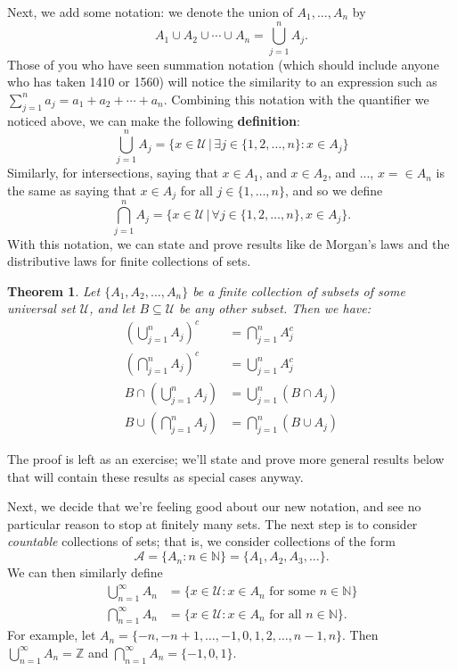 \documentclass[letterpaper,12pt]{article}
\newtheorem{theorem}{Theorem}
\newcommand{\U}{\mathcal{U}}
\newcommand{\N}{\mathbb{N}}
\begin{document}
Next, we add some notation: we denote the union of $A_1,\ldots, A_n$ by 
\[
A_1\cup A_2\cup \cdots \cup A_n =  \bigcup_{j=1}^n A_j.
\]
Those of you who have seen summation notation (which should include anyone who has taken 1410 or 1560) will notice the similarity to an expression such as $\displaystyle \sum_{j=1}^na_j = a_1+a_2+\cdots +a_n$. Combining this notation with the quantifier we noticed above, we can make the following {\bf definition}:
\[
 \bigcup_{j=1}^n A_j = \{x\in\U \,|\, \exists j\in\{1,2,\ldots, n\}: x\in A_j\}
\]
Similarly, for intersections, saying that $x\in A_1$, and $x\in A_2$, and ..., $x=\in A_n$ is the same as saying that $x\in A_j$ for all $j\in\{1,\ldots, n\}$, and so we define
\[
 \bigcap_{j=1}^nA_j = \{x\in\U\,|\, \forall j\in\{1,2,\ldots, n\}, x\in A_j\}.
\]
With this notation, we can state and prove results like de Morgan's laws and the distributive laws for finite collections of sets.
\begin{theorem}
 Let $\{A_1,A_2,\ldots, A_n\}$ be a finite collection of subsets of some universal set $\U$, and let $B\subseteq \U$ be any other subset. Then we have:
\begin{align}
 \left(\bigcup_{j=1}^n A_j\right)^c &= \bigcap_{j=1}^n A_j^c\\
 \left(\bigcap_{j=1}^n A_j\right)^c &= \bigcup_{j=1}^n A_j^c\\
 B\cap\left(\bigcup_{j=1}^n A_j\right) &= \bigcup_{j=1}^n(B\cap A_j)\\
 B\cup\left(\bigcap_{j=1}^n A_j\right) &= \bigcap_{j=1}^n(B\cup A_j)
\end{align}
\end{theorem}
The proof is left as an exercise; we'll state and prove more general results below that will contain these results as special cases anyway.

Next, we decide that we're feeling good about our new notation, and see no particular reason to stop at finitely many sets. The next step is to consider {\em countable} collections of sets; that is, we consider collections of the form
\[
 \mathcal{A} = \{A_n:n\in\N\} = \{A_1,A_2,A_3,\ldots\}.
\]
We can then similarly define
\begin{align*}
 \bigcup_{n=1}^\infty A_n &= \{x\in\U : x\in A_n \text{ for some } n\in\N\}\\
 \bigcap_{n=1}^\infty A_n & =\{x\in\U : x\in A_n \text{ for all } n\in\N\}.
\end{align*}
For example, let $A_n = \{-n, -n+1, \ldots, -1, 0, 1, 2, \ldots, n-1, n\}$. Then $\bigcup_{n=1}^\infty A_n = \mathbb{Z}$ and $\bigcap_{n=1}^\infty A_n = \{-1,0,1\}$.
\end{document}
